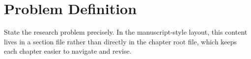 \section{Problem Definition}

State the research problem precisely. In the manuscript-style layout, this content lives in a section file rather than directly in the chapter root file, which keeps each chapter easier to navigate and revise.
